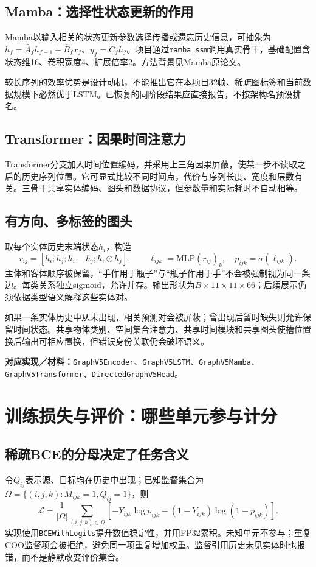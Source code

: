 \documentclass[11pt,a4paper,UTF8,fontset=fandol]{ctexart}
\newcommand{\code}[1]{{\small\nolinkurl{#1}}}
\newcommand{\where}[1]{\par{\small\color{green}\textbf{对应实现／材料：}#1}\par}
\begin{document}
\subsection{Mamba：选择性状态更新的作用}
Mamba以输入相关的状态更新参数选择传播或遗忘历史信息，可抽象为$h_f=\bar A_fh_{f-1}+\bar B_fx_f$、$y_f=C_fh_f$。项目通过\code{mamba_ssm}调用真实骨干，基础配置含状态维16、卷积宽度4、扩展倍率2。方法背景见\href{https://arxiv.org/abs/2312.00752}{Mamba原论文}。

较长序列的效率优势是设计动机，不能推出它在本项目32帧、稀疏图标签和当前数据规模下必然优于LSTM。已恢复的同阶段结果应直接报告，不按架构名预设排名。

\subsection{Transformer：因果时间注意力}
Transformer分支加入时间位置编码，并采用上三角因果屏蔽，使某一步不读取之后的历史序列位置。它可显式比较不同时间点，代价与序列长度、宽度和层数有关。三骨干共享实体编码、图头和数据协议，但参数量和实际耗时不自动相等。

\subsection{有方向、多标签的图头}
取每个实体历史末端状态$h_i$，构造
\[
r_{ij}=[h_i;h_j;h_i-h_j;h_i\odot h_j],\qquad
\ell_{ijk}=\mathrm{MLP}(r_{ij})_k,\quad p_{ijk}=\sigma(\ell_{ijk}).
\]
主体和客体顺序被保留，“手作用于瓶子”与“瓶子作用于手”不会被强制视为同一条边。每类关系独立sigmoid，允许并存。输出形状为$B\times11\times11\times66$；后续展示仍须依据类型语义解释这些实体对。

如果一条实体历史中从未出现，相关预测对会被屏蔽；曾出现后暂时缺失则允许保留时间状态。共享物体类别、空间集合注意力、共享时间模块和共享图头使槽位置换后输出可相应置换，但错误身份关联仍会破坏语义。
\where{\code{GraphV5Encoder}、\code{GraphV5LSTM}、\code{GraphV5Mamba}、\code{GraphV5Transformer}、\code{DirectedGraphV5Head}。}

\section{训练损失与评价：哪些单元参与计分}
\subsection{稀疏BCE的分母决定了任务含义}
令$Q_{ij}$表示源、目标均在历史中出现；已知监督集合为$\Omega=\{(i,j,k):M_{ijk}=1,Q_{ij}=1\}$，则
\[
\mathcal L=\frac{1}{|\Omega|}\sum_{(i,j,k)\in\Omega}
\left[-Y_{ijk}\log p_{ijk}-(1-Y_{ijk})\log(1-p_{ijk})\right].
\]
实现使用\code{BCEWithLogits}提升数值稳定性，并用FP32累积。未知单元不参与；重复COO监督项会被拒绝，避免同一项重复增加权重。监督引用历史未见实体时也报错，而不是静默改变评价集合。
\end{document}
